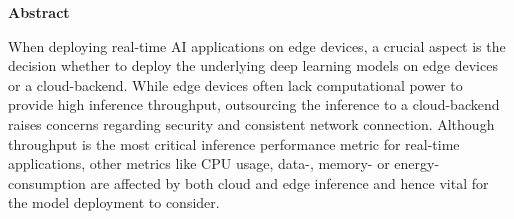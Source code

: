 \vspace*{2cm}

\begin{center}
    \textbf{Abstract}
\end{center}

\vspace*{1cm}

\begin{comment}
\noindent When deploying real-time AI applications, a crucial aspect is the decision whether to deploy the underlying deep learning models on edge devices or on a cloud-backend.
For the model inference various things need to be considered, among other things preprocessing, computational demands,
specialised hardware (GPU, TPU, neuromorphic co-processors, FPGA),
network latencies and energy consumption. Most of these aspects depend on both the model as well as the environment where the model is deployed. 
In order to help with the optimal selection of cloud and edge inference to achieve real-time AI, this thesis proposes a performance model characterising the deployment of a deep learning model and the resulting trade-offs.
Based on this performance model, the most essential trade-offs of the different deployment options get demonstrated by conducting multiple experiments using image classification as a use case. After the evaluation of these experiments, recommendations for the deployment are proposed.



-----------------------------------------------------------------------------
\end{comment}




\noindent When deploying real-time AI applications on edge devices, a crucial aspect is the decision whether to deploy the underlying deep learning models on edge devices or a cloud-backend.
While edge devices often lack computational power to provide high inference throughput, outsourcing the inference to a cloud-backend raises concerns regarding security and consistent network connection.
Although throughput is the most critical inference performance metric for real-time applications, other metrics like CPU usage, data-, memory- or energy-consumption are affected by both cloud and edge inference and hence vital for the model deployment to consider.

